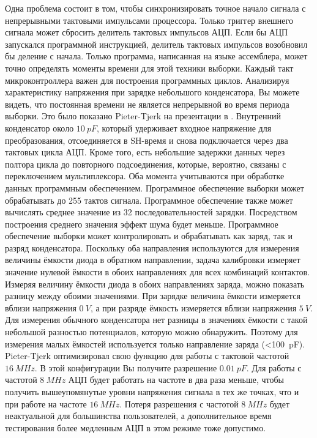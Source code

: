 Одна проблема состоит в том, чтобы синхронизировать точное начало сигнала с непрерывными
тактовыми импульсами процессора.
Только триггер внешнего сигнала может сбросить делитель тактовых импульсов АЦП.
Если бы АЦП запускался программной инструкцией, делитель тактовых импульсов возобновил бы деление с начала.
Только программа, написанная на языке ассемблера, может точно определять моменты времени для этой техники 
выборки. Каждый такт микроконтроллера важен для построения программных циклов.
Анализируя характеристику напряжения при зарядке небольшого конденсатора, Вы можете видеть, что постоянная
времени не является непрерывной во время периода выборки.
Это было показано Pieter-Tjerk на презентации в .
Внутренний конденсатор около \(10~pF\), который удерживает входное напряжение для преобразования,
отсоединяется в SH-время и снова подключается через два тактовых цикла АЦП.
Кроме того, есть небольшие задержки данных через полтора цикла до повторного подсоединения,
которые, вероятно, связаны с переключением мультиплексора.
Оба момента учитываются при обработке данных программным обеспечением.
Программное обеспечение выборки может обрабатывать до 255 тактов сигнала. Программное обеспечение
также может вычислять среднее значение из 32 последовательностей зарядки. Посредством построения
среднего значения эффект шума будет меньше.
Программное обеспечение выборки может контролировать и обрабатывать как заряд, так и
разряд конденсатора.
Поскольку оба направления используются для измерения величины ёмкости диода в обратном направлении,
задача калибровки измеряет значение нулевой ёмкости в обоих направлениях для всех комбинаций контактов.
Измеряя величину ёмкости диода в обоих направлениях заряда, можно показать разницу между обоими значениями.
При зарядке величина ёмкости измеряется вблизи напряжения \(0~V\), а при разряде ёмкость измеряется
вблизи напряжения \(5~V\).
Для измерения обычного конденсатора нет разницы в значениях ёмкости с такой небольшой разностью потенциалов,
которую можно обнаружить.
Поэтому для измерения малых ёмкостей используется только направление заряда (\textless 100~pF).
Pieter-Tjerk оптимизировал свою функцию для работы с тактовой частотой \(16~MHz\).
В этой конфигурации Вы получите разрешение \(0.01~pF\).
Для работы с частотой \(8~MHz\) АЦП будет работать на частоте в два раза меньше, чтобы
получить вышеупомянутые уровни напряжения сигнала в тех же точках, что и при работе на частоте \(16~MHz\).
Потеря разрешения с частотой \(8~MHz\) будет неактуальной для большинства пользователей,
а дополнительное время тестирования более медленным АЦП в этом режиме тоже допустимо.

